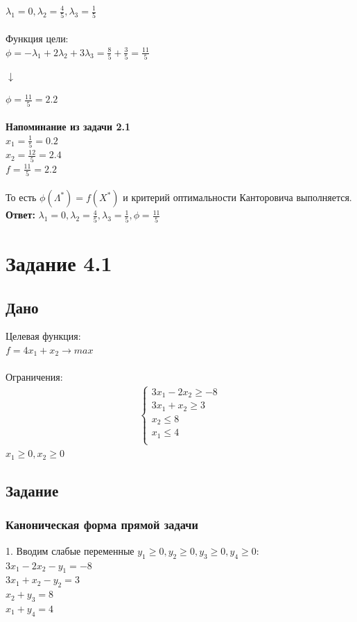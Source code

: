 \documentclass[14pt,a4paper,fleqn]{extarticle}
\begin{document}
$\lambda_1 = 0, \lambda_2 = \frac{4}{5}, \lambda_3 = \frac{1}{5}$\\\\
Функция цели:\\
$\phi = -\lambda_1 + 2\lambda_2 + 3\lambda_3 = \frac{8}{5} + \frac{3}{5} = \frac{11}{5}$
\begin{center}$\downarrow$\end{center}
$\phi = \frac{11}{5} = 2.2$\\
\noindent\makebox[\linewidth]{\rule{\paperwidth}{0.4pt}}\\
\textbf{Напоминание из задачи 2.1}\\
$x_1 = \frac{1}{5} = 0.2$\\
$x_2 = \frac{12}{5} = 2.4$\\
$f = \frac{11}{5} = 2.2$\\
\noindent\makebox[\linewidth]{\rule{\paperwidth}{0.4pt}}\\
То есть $\phi(\Lambda^*) = f(X^*)$ и критерий оптимальности Канторовича выполняется.\\
\textbf{Ответ:} $\lambda_1 = 0, \lambda_2 = \frac{4}{5}, \lambda_3 = \frac{1}{5}, \phi = \frac{11}{5}$
\newpage
\section*{Задание 4.1}
\subsection*{Дано}
Целевая функция:\\
$f = 4x_1+x_2 \longrightarrow max$\\\\
Ограничения:
\begin{align*}
	\begin{cases}
		3x_1 - 2x_2 \geq -8\\
		3x_1 + x_2 \geq 3\\
		x_2 \leq 8\\
		x_1 \leq 4\\
	\end{cases}
\end{align*}
$x_1 \geq 0, x_2 \geq 0$

\subsection*{Задание}
\subsubsection*{Каноническая форма прямой задачи}
1. Вводим слабые переменные $y_1 \geq 0, y_2 \geq 0, y_3 \geq 0, y_4 \geq 0$:\\
$3x_1 - 2x_2 - y_1 = -8$\\
$3x_1 + x_2 - y_2 = 3$\\
$x_2 + y_3 = 8$\\
$x_1 + y_4 = 4$\\
\end{document}
